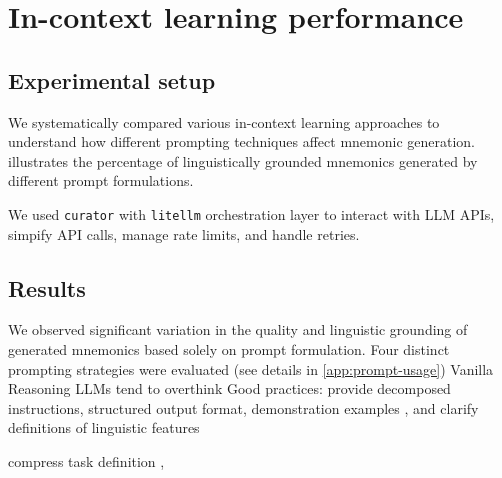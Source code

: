 

\section{In-context learning performance} \label{sec:icl-performance}

\subsection{Experimental setup}
We systematically compared various in-context learning approaches to understand how different prompting techniques affect mnemonic generation.  illustrates the percentage of linguistically grounded mnemonics generated by different prompt formulations.

We used \verb|curator| \citep{BespokeLabBESPOKE2025} with \verb|litellm| orchestration layer to interact with LLM APIs, simpify API calls, manage rate limits, and handle retries.

\subsection{Results}


We observed significant variation in the quality and linguistic grounding of generated mnemonics based solely on prompt formulation. Four distinct prompting strategies were evaluated (see details in \cref{app:prompt-usage})
Vanilla
Reasoning LLMs tend to overthink \citep{xuChainDraftThinking2025}
Good practices: provide decomposed instructions, structured output format, demonstration examples \citep{MishraREFRAMING2022}, and clarify definitions of linguistic features \citep{yinDidYouRead2023}

compress task definition \citep{yinDidYouRead2023},

